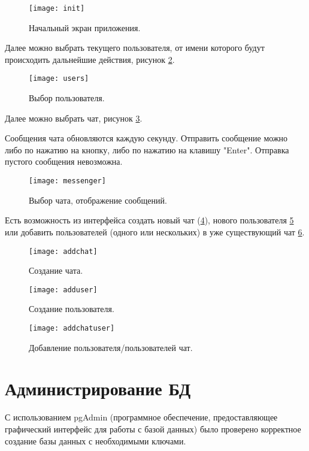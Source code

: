 \begin{figure}[H]
	\centering
	\texttt{[image: init]}
	\caption{Начальный экран приложения.  }
	\label{img:init}
\end{figure}

Далее можно выбрать текущего пользователя, от имени которого будут происходить дальнейшие действия, рисунок \ref{img:users}. 

\begin{figure}[H]
	\centering
	\texttt{[image: users]}
	\caption{Выбор пользователя.  }
	\label{img:users}
\end{figure}

Далее можно выбрать чат, рисунок \ref{img:messenger}.

Сообщения чата обновляются каждую секунду. Отправить сообщение можно либо по нажатию на кнопку, либо по нажатию на клавишу "Enter". Отправка пустого сообщения невозможна. 

\begin{figure}[H]
	\centering
	\texttt{[image: messenger]}
	\caption{Выбор чата, отображение сообщений.  }
	\label{img:messenger}
\end{figure}

Есть возможность из интерфейса создать новый чат (\ref{img:addchat}), нового пользователя \ref{img:adduser} или добавить пользователей (одного или нескольких) в уже существующий чат \ref{img:addchatuser}. 

\begin{figure}[H]
	\centering
	\texttt{[image: addchat]}
	\caption{Создание чата.  }
	\label{img:addchat}
\end{figure}

\begin{figure}[H]
	\centering
	\texttt{[image: adduser]}
	\caption{Создание пользователя.  }
	\label{img:adduser}
\end{figure}

\begin{figure}[H]
	\centering
	\texttt{[image: addchatuser]}
	\caption{Добавление пользователя/пользователей чат.  }
	\label{img:addchatuser}
\end{figure}

\section{\textbf{Администрирование БД}}

С использованием pgAdmin (программное обеспечение, предоставляющее графический интерфейс для работы с базой данных) было проверено корректное создание базы данных с необходимыми ключами. 

